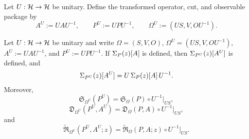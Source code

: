\begin{definition}
\label{def:observable-design-transform}
Let \(U:\mathcal{H}\to\mathcal{H}\) be unitary. Define the transformed
operator, cut, and observable package by
\[
A^U:=UAU^{-1},
\qquad
P^U:=UPU^{-1},
\qquad
\Omega^U:=(US,V,OU^{-1}).
\]
\end{definition}

\begin{theorem}
\label{thm:observable-transfer-covariance}
Let \(U:\mathcal{H}\to\mathcal{H}\) be unitary and write
\(\Omega=(S,V,O)\), \(\Omega^U=(US,V,OU^{-1})\),
\(A^U:=UAU^{-1}\), and \(P^U:=UPU^{-1}\). If
\(\Sigma_{P}(z)[A]\) is defined, then \(\Sigma_{P^U}(z)[A^U]\) is defined,
and
\[
\Sigma_{P^U}(z)[A^U]
=
U\,\Sigma_{P}(z)[A]\,U^{-1}.
\]
Moreover,
\[
\mathfrak S_{\Omega^U}(P^U)
=
\mathfrak S_{\Omega}(P)\circ U^{-1}\big|_{US},
\]
\[
\mathfrak D_{\Omega^U}(P^U,A^U)
=
\mathfrak D_{\Omega}(P,A)\circ U^{-1}\big|_{US},
\]
and
\[
\widetilde{\mathfrak R}_{\Omega^U}(P^U,A^U;z)
=
\widetilde{\mathfrak R}_{\Omega}(P,A;z)\circ U^{-1}\big|_{US}.
\]
\end{theorem}

